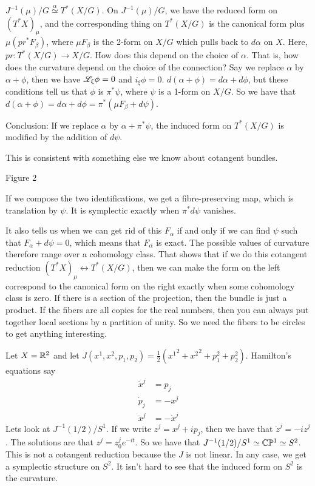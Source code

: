  $J^{-1}(\mu)/G \stackrel{\alpha}{\simeq} T^*(X/G)$.  On $J^{-1}(\mu)/G$, we have the
 reduced form on $(T^*X)_\mu$, and the corresponding thing on $T^*(X/G)$ is the
 canonical form plus $\mu(pr^* F_\beta)$, where $\mu F_\beta$ is the 2-form on $X/G$
 which pulls back to $d\alpha$ on $X$.  Here, $pr:T^*(X/G)\to X/G$.  How does this
 depend on the choice of $\alpha$.  That is, how does the curvature depend on the
 choice of the connection?  Say we replace $\alpha$ by $\alpha+\phi$, then we have
 $\mathscr{L}_\xi \phi=0$ and $i_\xi \phi=0$.  $d(\alpha+\phi)=d\alpha+d\phi$, but these
 conditions tell us that $\phi$ is $\pi^*\psi$, where $\psi$ is a 1-form on $X/G$.  So
 we have that $d(\alpha+\phi) = d\alpha + d\phi = \pi^*(\mu F_\beta + d\psi)$.

 Conclusion: If we replace $\alpha$ by $\alpha+\pi^*\psi$, the induced form on $T^*(X/G)$ is
 modified by the addition of $d\psi$.

 This is consistent with something else we know about cotangent bundles.

 Figure 2

 If we compose the two identifications, we get a fibre-preserving map, which is
 translation by $\psi$.  It is symplectic exactly when $\pi^*d\psi$ vanishes.

 It also tells us when we can get rid of this $F_\alpha$ if and only if we can find
 $\psi$ such that $F_\alpha + d\psi=0$, which means that $F_\alpha$ is exact.  The
 possible values of curvature therefore range over a cohomology class.  That shows
 that if we do this cotangent reduction $(T^*X)_\mu \leftrightarrow T^*(X/G)$, then we
 can make the form on the left correspond to the canonical form on the right exactly
 when some cohomology class is zero.  If there is a section of the projection, then
 the bundle is just a product.  If the fibers are all copies for the real numbers,
 then you can always put together local sections by a partition of unity.  So we need
 the fibers to be circles to get anything interesting.

 Let $X=\mathbb{R}^2$ and let $J(x^1,x^2,p_1,p_2)=\frac{1}{2}({x^1}^2+{x^2}^2+p_1^2+p_2^2)$.
 Hamilton's equations say
 \begin{align*}
   \dot{x}^j &= p_j\\
   \dot{p}_j &= -x^j\\
   \ddot{x}^j&=-\dot{x}^j
 \end{align*}
 Lets look at $J^{-1}(1/2)/S^1$.  If we write $z^j=x^j+ip_j$, then we have that
 $\dot{z}^j=-iz^j$.  The solutions are that $z^j=z^j_0 e^{-it}$.  So we have that
 $J^{-1}(1/2)/S^1\simeq \mathbb{C}\mathbb{P}^1\simeq S^2$.  This is not a cotangent reduction
 because the $J$ is not linear.  In any case, we get a symplectic structure on $S^2$.
 It isn't hard to see that the induced form on $S^2$ is the curvature.

